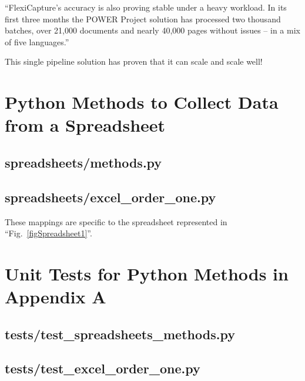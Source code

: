\documentclass[conference]{IEEEtran}
\begin{document}
``FlexiCapture's accuracy is also proving stable under a heavy workload. In its first three months the POWER Project solution has processed two thousand batches, over 21,000 documents and nearly 40,000 pages without issues – in a mix of five languages.'' \cite{pepsico}

This single pipeline solution has proven that it can scale and scale well!




\onecolumn
\appendices

\newpage
\section{Python Methods to Collect Data from a Spreadsheet}
    \subsection{spreadsheets/methods.py}
    

    \newpage
    \subsection{spreadsheets/excel\_order\_one.py}
    These mappings are specific to the spreadsheet represented in ``Fig.~\ref{figSpreadsheet1}''.
    

\newpage
\section{Unit Tests for Python Methods in Appendix A}
    \subsection{tests/test\_spreadsheets\_methods.py}
    

    \newpage
    \subsection{tests/test\_excel\_order\_one.py}
    

% 
% 
\end{document}
